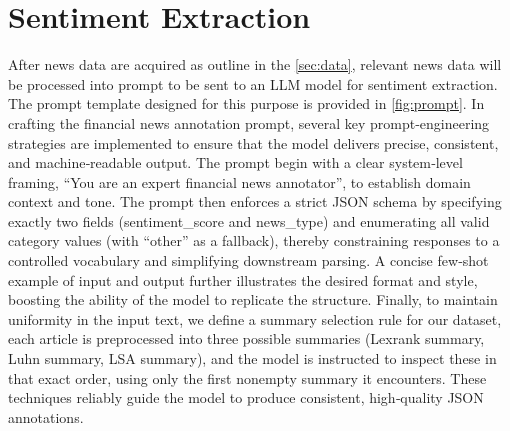 \begin{table}
  \centering
  \small
  \caption{Sample new data from FNSPID. The news content are processed into 4 different types of summaries making the LLM extraction process very token efficient.}
  \label{tab:news}
\end{table}

\section{Sentiment Extraction}
After news data are acquired as outline in the \ref{sec:data}, relevant news data will be processed into prompt to be sent to an \gls{LLM} model for sentiment extraction. The prompt template designed for this purpose is provided in \ref{fig:prompt}. In crafting the financial news annotation prompt, several key prompt‐engineering strategies are implemented to ensure that the model delivers precise, consistent, and machine‐readable output. The prompt begin with a clear system‐level framing, “You are an expert financial news annotator”, to establish domain context and tone. The prompt then enforces a strict JSON schema by specifying exactly two fields (sentiment\_score and news\_type) and enumerating all valid category values (with “other” as a fallback), thereby constraining responses to a controlled vocabulary and simplifying downstream parsing. A concise few‐shot example of input and output further illustrates the desired format and style, boosting the ability of the model to replicate the structure. Finally, to maintain uniformity in the input text, we define a summary selection rule for our dataset, each article is preprocessed into three possible summaries (Lexrank summary, Luhn summary, \gls{LSA} summary), and the model is instructed to inspect these in that exact order, using only the first nonempty summary it encounters. These techniques reliably guide the model to produce consistent, high‐quality JSON annotations.

